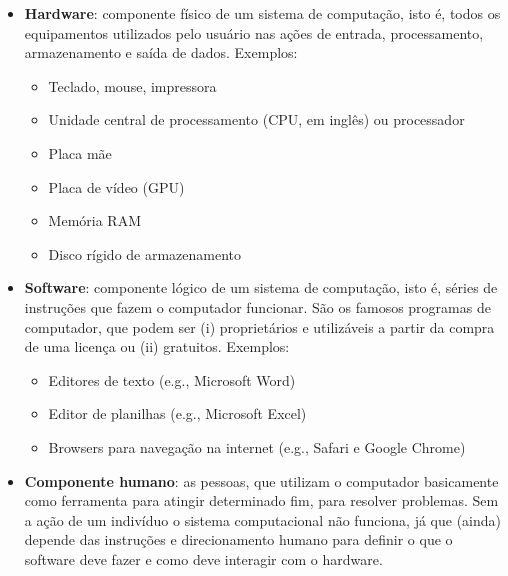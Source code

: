 \documentclass[
  brazilian,
  letterpaper,
  DIV=11,
  numbers=noendperiod]{scrreprt}
\providecommand{\tightlist}{%
  \setlength{\itemsep}{0pt}\setlength{\parskip}{0pt}}
\begin{document}
\begin{itemize}
\tightlist
\item
  \textbf{Hardware}: componente físico de um sistema de computação, isto
  é, todos os equipamentos utilizados pelo usuário nas ações de entrada,
  processamento, armazenamento e saída de dados. Exemplos:

  \begin{itemize}
  \tightlist
  \item
    Teclado, mouse, impressora
  \item
    Unidade central de processamento (CPU, em inglês) ou processador
  \item
    Placa mãe
  \item
    Placa de vídeo (GPU)
  \item
    Memória RAM
  \item
    Disco rígido de armazenamento
  \end{itemize}
\end{itemize}

\begin{itemize}
\tightlist
\item
  \textbf{Software}: componente lógico de um sistema de computação, isto
  é, séries de instruções que fazem o computador funcionar. São os
  famosos programas de computador, que podem ser (i) proprietários e
  utilizáveis a partir da compra de uma licença ou (ii) gratuitos.
  Exemplos:

  \begin{itemize}
  \tightlist
  \item
    Editores de texto (e.g., Microsoft Word)
  \item
    Editor de planilhas (e.g., Microsoft Excel)
  \item
    Browsers para navegação na internet (e.g., Safari e Google Chrome)
  \end{itemize}
\end{itemize}

\begin{itemize}
\tightlist
\item
  \textbf{Componente humano}: as pessoas, que utilizam o computador
  basicamente como ferramenta para atingir determinado fim, para
  resolver problemas. Sem a ação de um indivíduo o sistema computacional
  não funciona, já que (ainda) depende das instruções e direcionamento
  humano para definir o que o software deve fazer e como deve interagir
  com o hardware.
\end{itemize}
\end{document}
